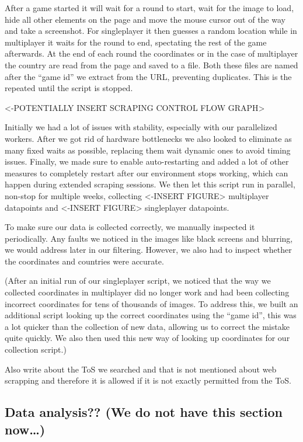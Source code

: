 After a game started it will wait for a round to start, wait for the
image to load, hide all other elements on the page and move the mouse
cursor out of the way and take a screenshot. For singleplayer it then
guesses a random location while in multiplayer it waits for the round to
end, spectating the rest of the game afterwards. At the end of each
round the coordinates or in the case of multiplayer the country are read
from the page and saved to a file. Both these files are named after the
``game id'' we extract from the URL, preventing duplicates. This is the
repeated until the script is stopped.

\textless-POTENTIALLY INSERT SCRAPING CONTROL FLOW GRAPH\textgreater{}

Initially we had a lot of issues with stability, especially with our
parallelized workers. After we got rid of hardware bottlenecks we also
looked to eliminate as many fixed waits as possible, replacing them wait
dynamic ones to avoid timing issues. Finally, we made sure to enable
auto-restarting and added a lot of other measures to completely restart
after our environment stops working, which can happen during extended
scraping sessions. We then let this script run in parallel, non-stop for
multiple weeks, collecting \textless-INSERT FIGURE\textgreater{}
multiplayer datapoints and \textless-INSERT FIGURE\textgreater{}
singleplayer datapoints.

To make sure our data is collected correctly, we manually inspected it
periodically. Any faults we noticed in the images like black screens and
blurring, we would address later in our filtering. However, we also had
to inspect whether the coordinates and countries were accurate.

(After an initial run of our singleplayer script, we noticed that the
way we collected coordinates in multiplayer did no longer work and had
been collecting incorrect coordinates for tens of thousands of images.
To address this, we built an additional script looking up the correct
coordinates using the ``game id'', this was a lot quicker than the
collection of new data, allowing us to correct the mistake quite
quickly. We also then used this new way of looking up coordinates for
our collection script.)

Also write about the ToS we searched and that is not mentioned about web
scrapping and therefore it is allowed if it is not exactly permitted
from the ToS.

\subsection{Data analysis?? (We do not have this section
now\ldots)}\label{data-analysis-we-do-not-have-this-section-now}

